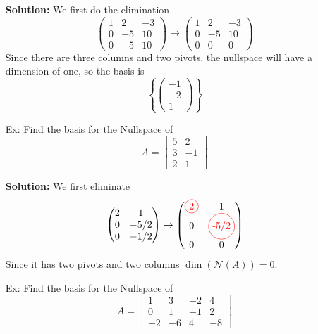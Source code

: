 \documentclass[reqno]{amsart}
\theoremstyle{definition}
\begin{document}
\begin{enumerate}
\textbf{Solution:  }
We first do the elimination
%
\begin{equation*}
\begin{pmatrix}
1 & 2 & -3\\
0 & -5 & 10\\
0 & -5 & 10
\end{pmatrix} \rightarrow \begin{pmatrix}
1 & 2 & -3\\
0 & -5 & 10\\
0 & 0 & 0
\end{pmatrix}
\end{equation*}
%
Since there are three columns and two pivots, the nullspace will have a dimension of one, so the basis is
%
\begin{equation*}
\left\lbrace \begin{pmatrix}
-1\\
-2\\
1
\end{pmatrix}\right\rbrace
\end{equation*}

\item[Ex:  ]  Find the basis for the Nullspace of
%
\begin{equation*}
A = \begin{bmatrix}
5 & 2\\
3 & -1\\
2 & 1
\end{bmatrix}
\end{equation*}

\textbf{Solution:  }
We first eliminate
%
\begin{equation*}
\begin{pmatrix}
2 & 1\\
0 & -5/2\\
0 & -1/2
\end{pmatrix} \rightarrow \begin{pmatrix}
\circled{2} & 1\\
0 & \circled{-5/2}\\
0 & 0
\end{pmatrix}
\end{equation*}
%
Since it has two pivots and two columns $\dim(\mathcal{N}(A)) = 0$.

\item[Ex:  ]  Find the basis for the Nullspace of
%
\begin{equation*}
A = \begin{bmatrix}
1 & 3 & -2 & 4\\
0 & 1 & -1 & 2\\
-2 & -6 & 4 & -8
\end{bmatrix}
\end{equation*}


\end{enumerate}
\end{document}
